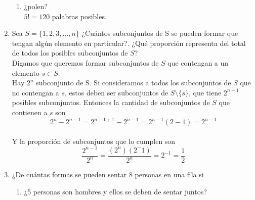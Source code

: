 \documentclass[12pt,a4paper]{report}
\begin{document}
\begin{enumerate}
{\begin{enumerate}[label=\alph*) ]
{	"esternocleidomastoideo" posee 22 letras. Si tomamos $22!$ tendríamos las combinaciones posibles, no obstante esto repitiría los casos con las letras que están más de una vez en la palabra. Entonces quedaría de la siguiente manera:\\ $\frac{22!}{4!2!2!4!2!2!}$ $\approx 1.21 \times 10^{17}$

   }

   \item {
   ¿polen?\\

	$5! = 120$ palabras posibles.
   }
	\end{enumerate}

	}

   \item {
    Sea $S = \{1, 2, 3, ... , n\}$ ¿Cuántos subconjuntos de S se pueden
    formar que tengan algún elemento en particular?. ¿Qué proporción
    representa del total de todos los posibles subconjuntos de $S$?\\

		Digamos que queremos formar subconjuntos de $S$ que contengan a un elemento
		$s \in S$.\\
		Hay $2^n$ subconjunto de S. Si consideramos a todos los subconjuntos de $S$ que no
		contengan a $s$, estos deben ser subconjuntos de $S \setminus \{s\}$, que tiene $2^{n-1}$
		posibles subconjuntos. Entonces la cantidad de subconjuntos de $S$ que
		contienen a $s$ son\\
		\begin{equation*}
			2^n - 2^{n-1} = 2^{n - 1 + 1} - 2^{n-1} = 2^{n-1}(2 - 1) = 2^{n-1}
		\end{equation*}\\
		Y la proporción de subconjuntos que lo cumplen son\\
		\begin{equation*}
			\frac{2^{n-1}}{2^n}	= \frac{(2^n) (2^-1)}{2^n} = 2^{-1} = \frac{1}{2}
		\end{equation*}
	}

   \item {
    ¿De cuántas formas se pueden sentar 8 personas en una fila si\\

	\begin{enumerate}[label=\alph*) ]
   \item {
   ¿5 personas son hombres y ellos se deben de sentar juntos?\\

}
\end{enumerate}}
\end{enumerate}
\end{document}
